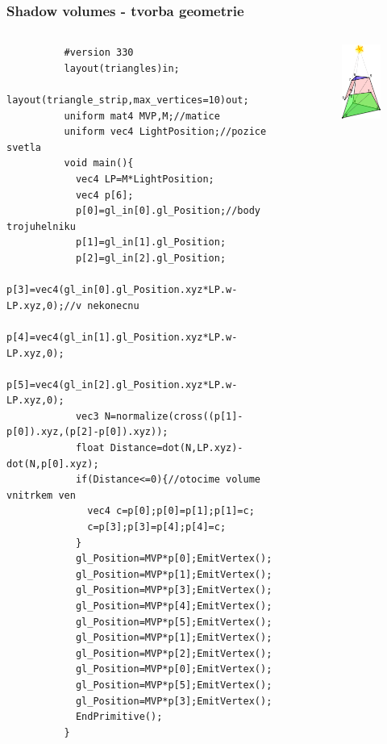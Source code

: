 \begin{frame}[fragile]
  \frametitle{Shadow volumes - tvorba geometrie}
  \begin{columns}[T]
    \begin{column}{.44\textwidth}
      {\tiny
        \begin{verbatim}
          #version 330
          layout(triangles)in;
          layout(triangle_strip,max_vertices=10)out;
          uniform mat4 MVP,M;//matice
          uniform vec4 LightPosition;//pozice svetla
          void main(){
            vec4 LP=M*LightPosition;
            vec4 p[6];
            p[0]=gl_in[0].gl_Position;//body trojuhelniku
            p[1]=gl_in[1].gl_Position;
            p[2]=gl_in[2].gl_Position;
            p[3]=vec4(gl_in[0].gl_Position.xyz*LP.w-LP.xyz,0);//v nekonecnu
            p[4]=vec4(gl_in[1].gl_Position.xyz*LP.w-LP.xyz,0);
            p[5]=vec4(gl_in[2].gl_Position.xyz*LP.w-LP.xyz,0);
            vec3 N=normalize(cross((p[1]-p[0]).xyz,(p[2]-p[0]).xyz));
            float Distance=dot(N,LP.xyz)-dot(N,p[0].xyz);
            if(Distance<=0){//otocime volume vnitrkem ven
              vec4 c=p[0];p[0]=p[1];p[1]=c;
              c=p[3];p[3]=p[4];p[4]=c;
            }
            gl_Position=MVP*p[0];EmitVertex();
            gl_Position=MVP*p[1];EmitVertex();
            gl_Position=MVP*p[3];EmitVertex();
            gl_Position=MVP*p[4];EmitVertex();
            gl_Position=MVP*p[5];EmitVertex();
            gl_Position=MVP*p[1];EmitVertex();
            gl_Position=MVP*p[2];EmitVertex();
            gl_Position=MVP*p[0];EmitVertex();
            gl_Position=MVP*p[5];EmitVertex();
            gl_Position=MVP*p[3];EmitVertex();
            EndPrimitive();
          }
        \end{verbatim}
      }
    \end{column}
    \begin{column}{.48\textwidth}
      \begin{figure}[h]
        \includegraphics[width=3cm,keepaspectratio]{pics/shadows/shadowVolumes/perTriangle.pdf}
      \end{figure}
    \end{column}
  \end{columns}

\end{frame}

